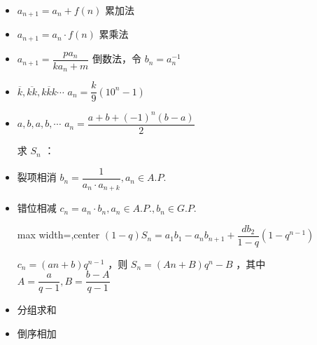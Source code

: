 \documentclass[twocolumn,10pt]{ctexart}
\begin{document}
\begin{itemize}
\item $a_{n+1}=a_n+f(n)$ 累加法
\end{itemize}

\begin{itemize}
\item $a_{n+1}=a_n\cdot f(n)$ 累乘法
\end{itemize}

\begin{itemize}
\item $a_{n+1}=\dfrac{pa_n}{ka_n+m}$ 倒数法，令 $b_n=a_n^{-1}$
\end{itemize}

\begin{itemize}
\item $\overline{k},\allowbreak{}\overline{kk},\allowbreak{}\overline{kkk}\cdots$ $a_n=\dfrac k9(10^n-1)$
\end{itemize}

\begin{itemize}
\item $a,b,a,b,\cdots$ $a_n=\dfrac{a+b+(-1)^n(b-a)}2$

求 $S_n$ ：
\end{itemize}

\begin{itemize}
\item 裂项相消 $b_n=\dfrac1{a_n\cdot a_{n+k}},\allowbreak{}a_n\in A.P.$
\end{itemize}

\begin{itemize}
\item 错位相减 $c_n=a_n\cdot b_n,\allowbreak{}a_n\in A.P.,\allowbreak{}b_n\in G.P.$

\begin{adjustbox}{max width=\linewidth,center}
$(1-q)S_n=a_1b_1-a_nb_{n+1}+\dfrac{db_2}{1-q}(1-q^{n-1})$
\end{adjustbox}

$c_n=(an+b)q^{n-1}$ ，则 $S_n=(An+B)q^n-B$ ，其中 $A=\dfrac a{q-1},\allowbreak{}B=\dfrac{b-A}{q-1}$
\end{itemize}

\begin{itemize}
\item 分组求和
\end{itemize}

\begin{itemize}
\item 倒序相加
\end{itemize}
\end{document}
